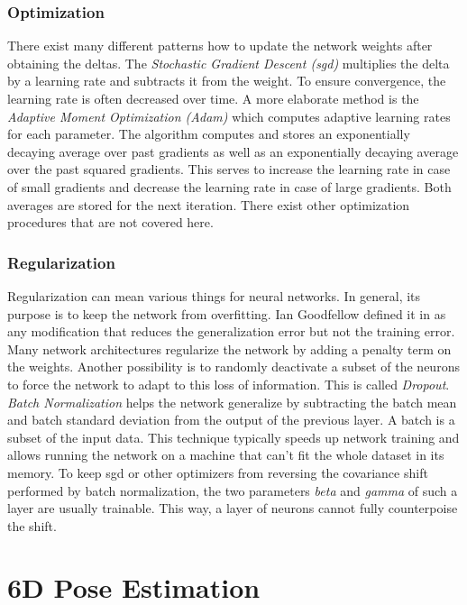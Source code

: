\subsubsection{Optimization} There exist many different patterns how to update the network weights after obtaining the deltas. The \textit{Stochastic Gradient Descent (\gls{sgd})} multiplies the delta by a learning rate and subtracts it from the weight. To ensure convergence, the learning rate is often decreased over time. A more elaborate method is the \textit{Adaptive Moment Optimization (Adam)} \cite{adam} which computes adaptive learning rates for each parameter. The algorithm computes and stores an exponentially decaying average over past gradients as well as an exponentially decaying average over the past squared gradients. This serves to increase the learning rate in case of small gradients and decrease the learning rate in case of large gradients. Both averages are stored for the next iteration. There exist other optimization procedures that are not covered here.
	
\subsubsection{Regularization} Regularization can mean various things for neural networks. In general, its purpose is to keep the network from overfitting. Ian Goodfellow defined it in \cite{goodfellow} as any modification that reduces the generalization error but not the training error. Many network architectures regularize the network by adding a penalty term on the weights. Another possibility is to randomly deactivate a subset of the neurons to force the network to adapt to this loss of information. This is called \textit{Dropout}. \textit{Batch Normalization} helps the network generalize by subtracting the batch mean and batch standard deviation from the output of the previous layer. A batch is a subset of the input data. This technique typically speeds up network training and allows running the network on a machine that can't fit the whole dataset in its memory. To keep \gls{sgd} or other optimizers from reversing the covariance shift performed by batch normalization, the two parameters \textit{beta} and \textit{gamma} of such a layer are usually trainable. This way, a layer of neurons cannot fully counterpoise the shift. 

\section{6D Pose Estimation}

